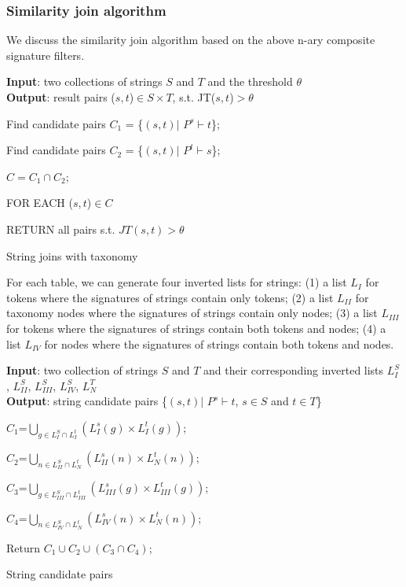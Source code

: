 \subsubsection{Similarity join algorithm}

We discuss the similarity join algorithm based on the above n-ary composite signature filters.


\begin{algorithm}
{\bf Input}:  two collections of strings $S$ and $T$ and the threshold $\theta$ \\
{\bf Output}: result pairs ($s,t$)$\in S \times T$, s.t. JT($s,t$)$> \theta$
\begin{compactenum}[(1)]
\item Find candidate pairs $C_1$ = \{$(s,t) |$  $P^s \vdash t$\};
\item Find candidate pairs $C_2$ = \{$(s,t) |$  $P^t \vdash s$\};
\item  $C= C_1 \cap C_2$;
\item FOR EACH ($s,t$)$\in C$
\item RETURN all pairs s.t. $JT(s,t) > \theta$
\end{compactenum}
\caption{String joins with taxonomy}
\label{alg:exactjoin}
\end{algorithm}

For each table, we can generate four inverted lists for strings: (1) a list $L_I$ for tokens where the signatures of strings contain only tokens; (2) a list $L_{II}$ for taxonomy nodes where the signatures of strings contain only nodes; (3) a list $L_{III}$ for tokens where the signatures of strings contain both tokens and nodes; (4)  a list $L_{IV}$ for nodes where the signatures of strings contain both tokens and nodes.


\begin{algorithm}
{\bf Input}: two collection of strings $S$ and $T$ and their corresponding inverted lists $L_I^S$,  $L_{II}^S$, $L_{III}^S$, $L_{IV}^S$, $L_N^T$ \\
{\bf Output}: string candidate pairs \{$(s,t) |$  $P^s \vdash t$, $s \in S$ and $t \in T$\}
\begin{compactenum}[(1)]
\item  $C_1$=$\displaystyle\bigcup_{g \in L_I^S \cap L_I^t} (L_I^s(g) \times L_I^t(g)) $;
\item  $C_2$=$\displaystyle\bigcup_{n \in L_{II}^S \cap L_N^t} (L_{II}^s(n) \times L_N^t(n)) $;
\item  $C_3$=$\displaystyle\bigcup_{g \in L_{III}^S \cap L_{III}^t} (L_{III}^s(g) \times L_{III}^t(g)) $;
\item  $C_4$=$\displaystyle\bigcup_{n \in L_{IV}^S \cap L_N^t} (L_{IV}^s(n) \times L_N^t(n)) $;
\item   Return $C_1 \cup C_2 \cup (C_3 \cap C_4)$;

\end{compactenum}
\caption{String candidate pairs}
\label{alg:exactjoin}
\end{algorithm}

